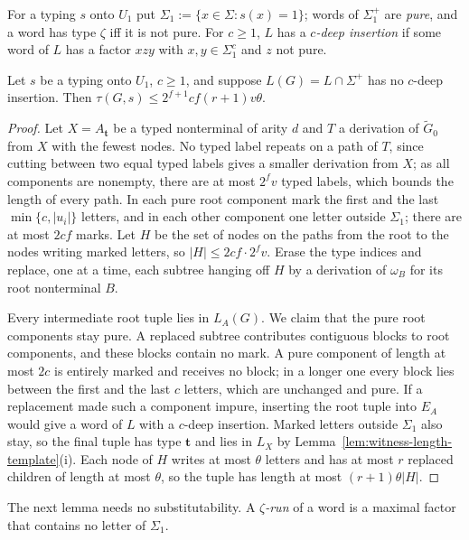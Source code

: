 For a typing $s$ onto $U_1$ put $\Sigma_1:=\{x\in\Sigma:s(x)=1\}$; words of
$\Sigma_1^+$ are \emph{pure}, and a word has type $\zeta$ iff it is not pure.  For
$c\ge1$, $L$ has a \emph{$c$-deep insertion} if some word of $L$ has a factor
$xzy$ with $x,y\in\Sigma_1^c$ and $z$ not pure.

\begin{lemma}\label{lem:app-u1-shallow}
Let $s$ be a typing onto $U_1$, $c\ge1$, and suppose $L(G)=L\cap\Sigma^+$ has no
$c$-deep insertion.  Then $\tau(G,s)\le2^{f+1}cf(r+1)v\theta$.
\end{lemma}

\begin{proof}
Let $X=A_{\mathbf t}$ be a typed nonterminal of arity $d$ and $T$ a derivation of
$\widetilde G_0$ from $X$ with the fewest nodes.  No typed label repeats on a path
of $T$, since cutting between two equal typed labels gives a smaller derivation
from $X$; as all components are nonempty, there are at most $2^fv$ typed labels,
which bounds the length of every path.  In each pure root component mark the
first and the last $\min\{c,|u_i|\}$ letters, and in each other component one
letter outside $\Sigma_1$; there are at most $2cf$ marks.  Let $H$ be the set of
nodes on the paths from the root to the nodes writing marked letters, so
$|H|\le2cf\cdot2^fv$.  Erase the type indices and replace, one at a time, each
subtree hanging off $H$ by a derivation of $\omega_B$ for its root nonterminal $B$.

Every intermediate root tuple lies in $L_A(G)$.  We claim that the pure root
components stay pure.  A replaced subtree contributes contiguous blocks to root
components, and these blocks contain no mark.  A pure component of length at
most $2c$ is entirely marked and receives no block; in a longer one every block
lies between the first and the last $c$ letters, which are unchanged and pure.
If a replacement made such a component impure, inserting the root tuple into
$E_A$ would give a word of $L$ with a $c$-deep insertion.  Marked letters outside
$\Sigma_1$ also stay, so the final tuple has type $\mathbf t$ and lies in $L_X$ by
Lemma~\ref{lem:witness-length-template}(i).  Each node of $H$ writes at most
$\theta$ letters and has at most $r$ replaced children of length at most
$\theta$, so the tuple has length at most $(r+1)\theta|H|$.
\end{proof}

The next lemma needs no substitutability.  A \emph{$\zeta$-run} of a word is a
maximal factor that contains no letter of $\Sigma_1$.

